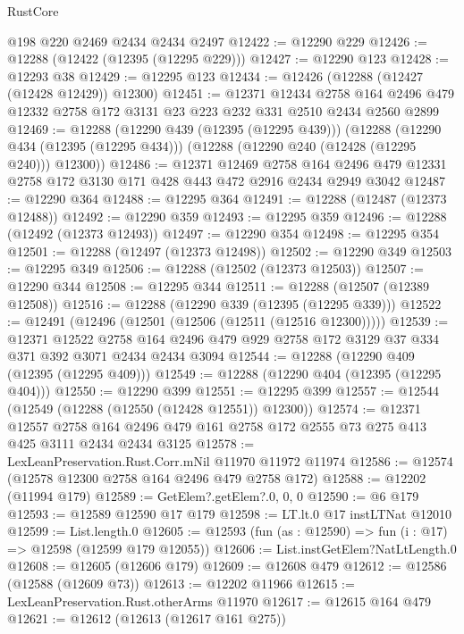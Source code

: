 \begin{lexlean}{RustCore}
\begin{coremodule}
    @198
    @220
    @2469
    @2434
    @2434
    @2497
@12422 := @12290 @229
@12426 := @12288 (@12422 (@12395 (@12295 @229)))
@12427 := @12290 @123
@12428 := @12293 @38
@12429 := @12295 @123
@12434 := @12426 (@12288 (@12427 (@12428 @12429)) @12300)
@12451 := @12371
    @12434
    @2758
    @164
    @2496
    @479
    @12332
    @2758
    @172
    @3131
    @23
    @223
    @232
    @331
    @2510
    @2434
    @2560
    @2899
@12469 := @12288
    (@12290 @439 (@12395 (@12295 @439)))
    (@12288
      (@12290 @434 (@12395 (@12295 @434)))
      (@12288 (@12290 @240 (@12428 (@12295 @240))) @12300))
@12486 := @12371
    @12469
    @2758
    @164
    @2496
    @479
    @12331
    @2758
    @172
    @3130
    @171
    @428
    @443
    @472
    @2916
    @2434
    @2949
    @3042
@12487 := @12290 @364
@12488 := @12295 @364
@12491 := @12288 (@12487 (@12373 @12488))
@12492 := @12290 @359
@12493 := @12295 @359
@12496 := @12288 (@12492 (@12373 @12493))
@12497 := @12290 @354
@12498 := @12295 @354
@12501 := @12288 (@12497 (@12373 @12498))
@12502 := @12290 @349
@12503 := @12295 @349
@12506 := @12288 (@12502 (@12373 @12503))
@12507 := @12290 @344
@12508 := @12295 @344
@12511 := @12288 (@12507 (@12389 @12508))
@12516 := @12288 (@12290 @339 (@12395 (@12295 @339)))
@12522 := @12491 (@12496 (@12501 (@12506 (@12511 (@12516 @12300)))))
@12539 := @12371
    @12522
    @2758
    @164
    @2496
    @479
    @929
    @2758
    @172
    @3129
    @37
    @334
    @371
    @392
    @3071
    @2434
    @2434
    @3094
@12544 := @12288 (@12290 @409 (@12395 (@12295 @409)))
@12549 := @12288 (@12290 @404 (@12395 (@12295 @404)))
@12550 := @12290 @399
@12551 := @12295 @399
@12557 := @12544 (@12549 (@12288 (@12550 (@12428 @12551)) @12300))
@12574 := @12371
    @12557
    @2758
    @164
    @2496
    @479
    @161
    @2758
    @172
    @2555
    @73
    @275
    @413
    @425
    @3111
    @2434
    @2434
    @3125
@12578 := LexLeanPreservation.Rust.Corr.mNil @11970 @11972 @11974
@12586 := @12574 (@12578 @12300 @2758 @164 @2496 @479 @2758 @172)
@12588 := @12202 (@11994 @179)
@12589 := GetElem?.getElem?.{0, 0, 0}
@12590 := @6 @179
@12593 := @12589 @12590 @17 @179
@12598 := LT.lt.{0} @17 instLTNat @12010
@12599 := List.length.{0}
@12605 := @12593 (fun (as : @12590) => fun (i : @17) => @12598 (@12599 @179 @12055))
@12606 := List.instGetElem?NatLtLength.{0}
@12608 := @12605 (@12606 @179)
@12609 := @12608 @479
@12612 := @12586 (@12588 (@12609 @73))
@12613 := @12202 @11966
@12615 := LexLeanPreservation.Rust.otherArms @11970
@12617 := @12615 @164 @479
@12621 := @12612 (@12613 (@12617 @161 @275))

\end{coremodule}
\end{lexlean}

